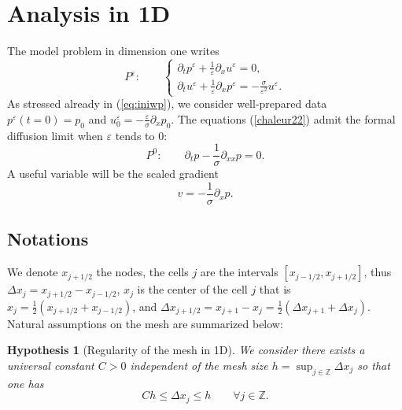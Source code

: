 \documentclass[a4paper,french,english,10pt]{article}
\newcommand\eps{\varepsilon}
\newcommand{\dx}{\partial_x}
\newcommand{\dt}{\partial_t}
\newtheorem{hyp}[theorem]{Hypothesis}
\begin{document}
\section{Analysis in 1D} \label{sec:2}



The model problem in dimension one writes
\begin{equation}\label{chaleur22}
P^\varepsilon: \qquad
 \left \{
\begin{array}{lll}
\partial_t p^{\eps} + \frac{1}{\eps}\partial_x u^{\eps} =0, \\
\partial_t u^{\eps} + \frac{1}{\eps}\partial_x p^{\eps} =
-\frac{\sigma}{\eps^2}u^{\eps}.
\end{array}
\right.
\end{equation}
As stressed already in (\ref{eq:iniwp}), we consider well-prepared data
$
p^\varepsilon(t=0)=p_0 $  and  $u_0^\varepsilon=-\frac\varepsilon \sigma \partial_{x}p_0$.
The equations (\ref{chaleur22}) 
admit the formal diffusion limit when $\eps$ tends to $0$:
\begin{equation}\label{difffff}
P^0: \qquad 
\dt p -\frac{1}{\sigma}\partial_{xx}p=0.
\end{equation}
A useful variable will be  the scaled gradient  
\begin{equation} \label{eq:diff-v}
v=-\frac{1}{\sigma}\dx p.
\end{equation}

\subsection{Notations}
We denote $x_{j+1/2}$ the nodes, the cells $j$ are the intervals $[x_{j-1/2},x_{j+1/2}]$, thus $\Delta x_j=x_{j+1/2}-x_{j-1/2}$, $x_j$ is the center of the cell $j$ that is $x_j =\frac12(x_{j+1/2}+x_{j-1/2})$, and $\Delta x_{j+1/2}=x_{j+1}-x_j=\frac12(\Delta x_{j+1}+\Delta x_{j})$. Natural assumptions on the mesh are summarized below:

\begin{hyp}[Regularity of the mesh in 1D] \label{geometrie1d}
 We consider there exists 
a universal constant $C>0$ independent of the mesh size
$h=\sup_{j\in \mathbb Z} \Delta x_j $
so that one has 
$$
Ch \leq \Delta x_j \leq h \qquad \forall j \in \mathbb{Z}.
$$
\end{hyp}
\end{document}
